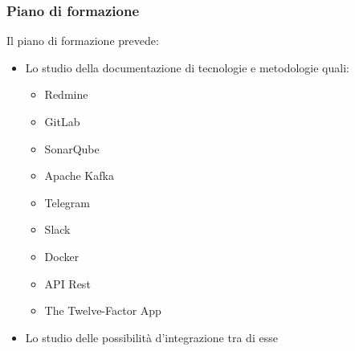 		\subsubsection{Piano di formazione}
		Il piano di formazione prevede:
		\begin{itemize}
			\item Lo studio della documentazione di tecnologie e metodologie quali:
			\begin{itemize}
				\item Redmine
				\item GitLab
				\item SonarQube
				\item Apache Kafka
				\item Telegram
				\item Slack
				\item Docker
				\item API Rest
				\item The Twelve-Factor App %
			\end{itemize}
			\item Lo studio delle possibilità d'integrazione tra di esse
		\end{itemize}
		
